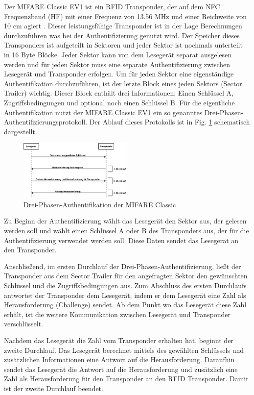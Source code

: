 \documentclass[conference]{IEEEtran}
\begin{document}
Der MIFARE Classic EV1 ist ein RFID Transponder, der auf dem NFC Frequenzband (HF) mit einer Frequenz von 13.56 MHz und einer Reichweite von 10 cm agiert \cite{b4}. Dieser leistungsfähige Transponder ist in der Lage Berechnungen durchzuführen was bei der Authentifizierung genutzt wird. Der Speicher dieses Transponders ist aufgeteilt in Sektoren und jeder Sektor ist nochmals unterteilt in 16 Byte Blöcke. Jeder Sektor kann von dem Lesegerät separat ausgelesen werden und für jeden Sektor muss eine separate Authentifizierung zwischen Lesegerät und Transponder erfolgen. Um für jeden Sektor eine eigenständige Authentifikation durchzuführen, ist der letzte Block eines jeden Sektors (Sector Trailer) wichtig. Dieser Block enthält drei Informationen: Einen Schlüssel A, Zugriffsbedingungen und optional noch einen Schlüssel B. Für die eigentliche Authentifikation nutzt der MIFARE Classic EV1 ein so genanntes Drei-Phasen-Authentifizierungsprotokoll. Der Ablauf dieses Protokolls ist in Fig. \ref{fig4} schematisch dargestellt.

\begin{figure}[htbp]
\centerline{\includegraphics[width=0.5\textwidth]{img/three_pass.png}}
\caption{Drei-Phasen-Authentifikation der MIFARE Classic}
\label{fig4}
\end{figure}

Zu Beginn der Authentifizierung wählt das Lesegerät den Sektor aus, der gelesen werden soll und wählt einen Schlüssel A oder B des Transponders aus, der für die Authentifizierung verwendet werden soll. Diese Daten sendet das Lesegerät an den Transponder. 

Anschließend, im ersten Durchlauf der Drei-Phasen-Authentifizierung, ließt der Transponder aus dem Sector Trailer für den angefragten Sektor den gewünschten Schlüssel und die Zugriffsbedingungen aus. Zum Abschluss des ersten Durchlaufs antwortet der Transponder dem Lesegerät, indem er dem Lesegerät eine Zahl als Herausforderung (Challenge) sendet. Ab dem Punkt wo das Lesegerät diese Zahl erhält, ist die weitere Kommunikation zwischen Lesegerät und Transponder verschlüsselt.

Nachdem das Lesegerät die Zahl vom Transponder erhalten hat, beginnt der zweite Durchlauf. Das Lesegerät berechnet mittels des gewählten Schlüssels und zusätzlichen Informationen eine Antwort auf die Herausforderung. Daraufhin sendet das Lesegerät die Antwort auf die Herausforderung und zusätzlich eine Zahl als Herausforderung für den Transponder an den RFID Transponder. Damit ist der zweite Durchlauf beendet.
\end{document}

